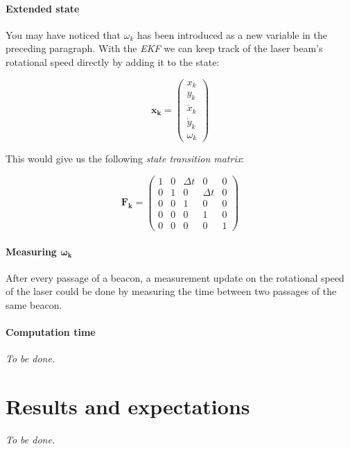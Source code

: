 \documentclass[a4paper, 12pt]{paper}
\begin{document}
\paragraph{Extended state}

You may have noticed that $\omega_k$ has been introduced as a new variable in
the preceding paragraph. With the \emph{EKF} we can keep track of the
laser beam's rotational speed directly by adding it to the state:


\begin{equation}
    \mathbf{x_k} = \left( \begin{array}{c} x_k     \\
                                           y_k     \\
                                           \dot{x}_k \\
                                           \dot{y}_k \\
                                           \omega_k \end{array} \right)
\label{eq:ekf_state}
\end{equation}

This would give us the following \emph{state transition matrix}:

\begin{equation}
    \mathbf{F_k} = \left( \begin{array}{ccccc} 1 & 0 & \Delta t & 0 & 0 \\
                                              0 & 1 & 0 & \Delta t & 0  \\
                                              0 & 0 & 1 & 0 & 0 \\
                                              0 & 0 & 0 & 1 & 0 \\
                                              0 & 0 & 0 & 0 & 1
                                        \end{array} \right)
\label{eq:ekf_state_trans}
\end{equation}

\paragraph{Measuring $\mathbf{\omega_k}$}

After every passage of a beacon, a measurement update on the rotational speed
of the laser could be done by measuring the time between two passages of the
same beacon.

\paragraph{Computation time}
\emph{To be done.}

\section{Results and expectations}

\emph{To be done.}




\end{document}
